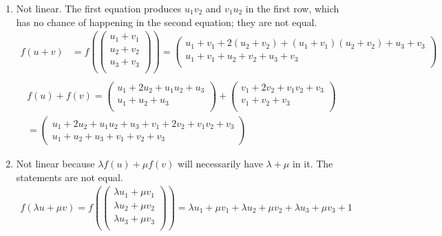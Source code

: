 \documentclass{article}
\begin{document}
\begin{enumerate}
    \item Not linear. The first equation produces $u_1v_2$ and $v_1u_2$ in the first row, which has no chance of happening in the second equation; they are not equal.
    \begin{align*}
        f(u + v) &= f\left(\begin{pmatrix}
            u_1 + v_1 \\
            u_2 + v_2 \\
            u_3 + v_3 \\
        \end{pmatrix}\right) = \begin{pmatrix}
            u_1 + v_1 + 2(u_2 + v_2) + (u_1 + v_1)(u_2 + v_2) + u_3 + v_3 \\
            u_1 + v_1 + u_2 + v_2 + u_3 + v_3 \\
        \end{pmatrix} \\
    \end{align*}
    \begin{align*}
        f(u) + f(v) = \begin{pmatrix}
            u_1 + 2u_2 + u_1u_2 + u_3 \\
            u_1 + u_2 + u_3 \\
        \end{pmatrix} + \begin{pmatrix}
            v_1 + 2v_2 + v_1v_2 + v_3 \\
            v_1 + v_2 + v_3 \\
        \end{pmatrix} \\ = \begin{pmatrix}
            u_1 + 2u_2 + u_1u_2 + u_3 + v_1 + 2v_2 + v_1v_2 + v_3 \\
            u_1 + u_2 + u_3 + v_1 + v_2 + v_3
        \end{pmatrix}
    \end{align*}

    \item Not linear because $\lambda f(u) + \mu f(v)$ will necessarily have $\lambda + \mu$ in it. The statements are not equal. \begin{align*}
        f(\lambda u + \mu v) =
        f\left(\begin{pmatrix}
            \lambda u_1 + \mu v_1 \\
            \lambda u_2 + \mu v_2 \\
            \lambda u_3 + \mu v_3 \\
        \end{pmatrix}\right) =
        \lambda u_1 + \mu v_1 + \lambda u_2 + \mu v_2 + \lambda u_3 + \mu v_3 + 1
    \end{align*}


\end{enumerate}
\end{document}
